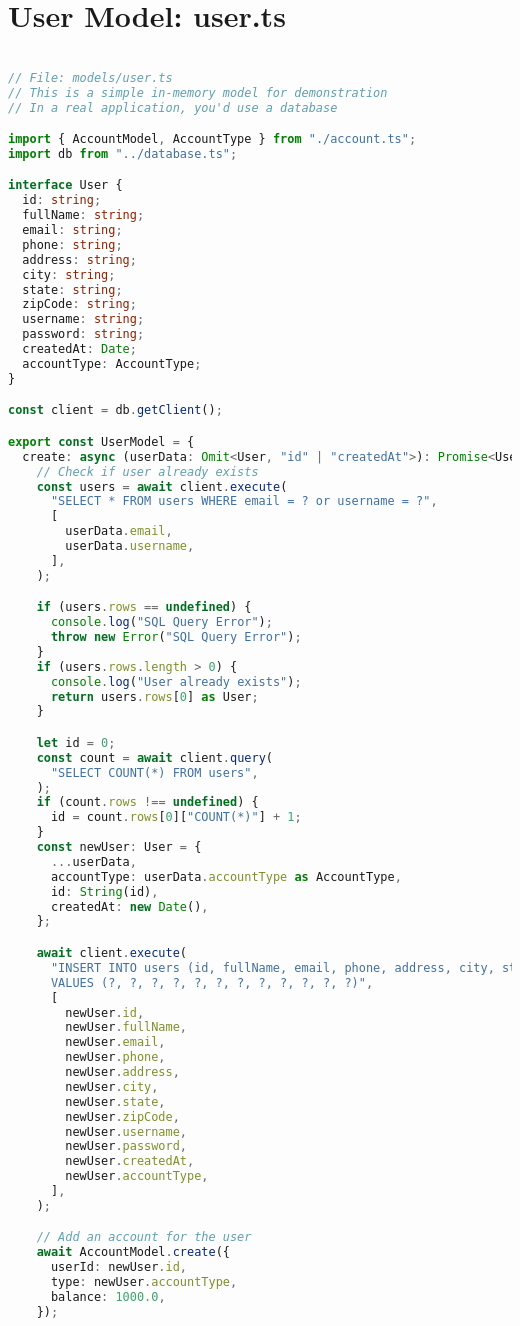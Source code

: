 \section{User Model: user.ts}
\begin{lstlisting}[language=TypeScript]

// File: models/user.ts
// This is a simple in-memory model for demonstration
// In a real application, you'd use a database

import { AccountModel, AccountType } from "./account.ts";
import db from "../database.ts";

interface User {
  id: string;
  fullName: string;
  email: string;
  phone: string;
  address: string;
  city: string;
  state: string;
  zipCode: string;
  username: string;
  password: string;
  createdAt: Date;
  accountType: AccountType;
}

const client = db.getClient();

export const UserModel = {
  create: async (userData: Omit<User, "id" | "createdAt">): Promise<User> => {
    // Check if user already exists
    const users = await client.execute(
      "SELECT * FROM users WHERE email = ? or username = ?",
      [
        userData.email,
        userData.username,
      ],
    );

    if (users.rows == undefined) {
      console.log("SQL Query Error");
      throw new Error("SQL Query Error");
    }
    if (users.rows.length > 0) {
      console.log("User already exists");
      return users.rows[0] as User;
    }

    let id = 0;
    const count = await client.query(
      "SELECT COUNT(*) FROM users",
    );
    if (count.rows !== undefined) {
      id = count.rows[0]["COUNT(*)"] + 1;
    }
    const newUser: User = {
      ...userData,
      accountType: userData.accountType as AccountType,
      id: String(id),
      createdAt: new Date(),
    };

    await client.execute(
      "INSERT INTO users (id, fullName, email, phone, address, city, state, zipCode, username, password, createdAt, accountType) \
      VALUES (?, ?, ?, ?, ?, ?, ?, ?, ?, ?, ?, ?)",
      [
        newUser.id,
        newUser.fullName,
        newUser.email,
        newUser.phone,
        newUser.address,
        newUser.city,
        newUser.state,
        newUser.zipCode,
        newUser.username,
        newUser.password,
        newUser.createdAt,
        newUser.accountType,
      ],
    );

    // Add an account for the user
    await AccountModel.create({
      userId: newUser.id,
      type: newUser.accountType,
      balance: 1000.0,
    });


\end{lstlisting}
